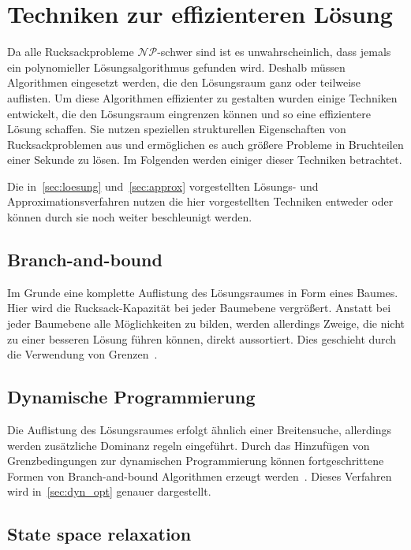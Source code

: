 \documentclass[12pt, a4paper, ngerman]{article}
\begin{document}
\section{Techniken zur effizienteren Lösung}

Da alle Rucksackprobleme \(\mathcal{NP}\)-schwer sind ist es unwahrscheinlich,
dass jemals ein polynomieller Lösungsalgorithmus gefunden wird.
Deshalb müssen Algorithmen eingesetzt werden,
die den Lösungsraum ganz oder teilweise auflisten.
Um diese Algorithmen effizienter zu gestalten wurden einige Techniken entwickelt,
die den Lösungsraum eingrenzen können und so eine effizientere Lösung schaffen.
Sie nutzen speziellen strukturellen Eigenschaften von Rucksackproblemen aus
und ermöglichen es auch größere Probleme in Bruchteilen einer Sekunde zu lösen.
Im Folgenden werden einiger dieser Techniken betrachtet.

Die in~\ref{sec:loesung} und~\ref{sec:approx} vorgestellten Lösungs- und Approximationsverfahren
nutzen die hier vorgestellten Techniken entweder oder können durch sie noch weiter beschleunigt werden.

\subsection{Branch-and-bound}

Im Grunde eine komplette Auflistung des Lösungsraumes in Form eines Baumes.
Hier wird die Rucksack-Kapazität bei jeder Baumebene vergrößert.
Anstatt bei jeder Baumebene alle Möglichkeiten zu bilden,
werden allerdings Zweige,
die nicht zu einer besseren Lösung führen können,
direkt aussortiert.
Dies geschieht durch die Verwendung von Grenzen~\cite{algos_knapsack}.

\subsection{Dynamische Programmierung}

Die Auflistung des Lösungsraumes erfolgt ähnlich einer Breitensuche,
allerdings werden zusätzliche Dominanz regeln eingeführt.
Durch das Hinzufügen von Grenzbedingungen zur dynamischen Programmierung
können fortgeschrittene Formen von Branch-and-bound Algorithmen erzeugt werden~\cite{algos_knapsack}.
Dieses Verfahren wird in~\ref{sec:dyn_opt} genauer dargestellt.

\subsection{State space relaxation}
\end{document}
